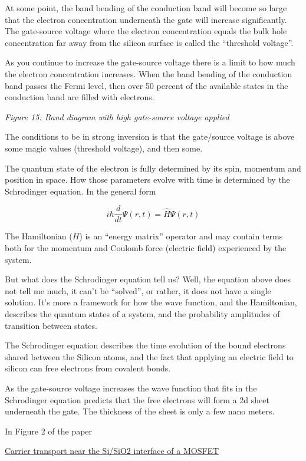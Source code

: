 At some point, the band bending of the conduction band will become so
large that the electron concentration underneath the gate will increase
significantly. The gate-source voltage where the electron concentration
equals the bulk hole concentration far away from the silicon surface is
called the ``threshold voltage''.

As you continue to increase the gate-source voltage there is a limit to
how much the electron concentration increases. When the band bending of
the conduction band passes the Fermi level, then over 50 percent of the
available states in the conduction band are filled with electrons.


{
\centering
{}
}

\emph{Figure 15: Band diagram with high gate-source voltage applied }

The conditions to be in strong inversion is that the gate/source voltage
is above some magic values (threshold voltage), and then some.

The quantum state of the electron is fully determined by its spin,
momentum and position in space. How those parameters evolve with time is
determined by the Schrodinger equation. In the general form

\[ i\hbar\frac{d}{dt}\Psi(r,t) = \widehat{H} \Psi(r,t) \]

The Hamiltonian (\(H\)) is an ``energy matrix'' operator and may contain
terms both for the momentum and Coulomb force (electric field)
experienced by the system.

But what does the Schrodinger equation tell us? Well, the equation above
does not tell me much, it can't be ``solved'', or rather, it does not
have a single solution. It's more a framework for how the wave function,
and the Hamiltonian, describes the quantum states of a system, and the
probability amplitudes of transition between states.

The Schrodinger equation describes the time evolution of the bound
electrons shared between the Silicon atoms, and the fact that applying
an electric field to silicon can free electrons from covalent bonds.

As the gate-source voltage increases the wave function that fits in the
Schrodinger equation predicts that the free electrons will form a 2d
sheet underneath the gate. The thickness of the sheet is only a few nano
meters.

In Figure 2 of the paper

\href{https://www.sciencedirect.com/science/article/pii/0038110189900609}{Carrier
transport near the Si/SiO2 interface of a MOSFET}

